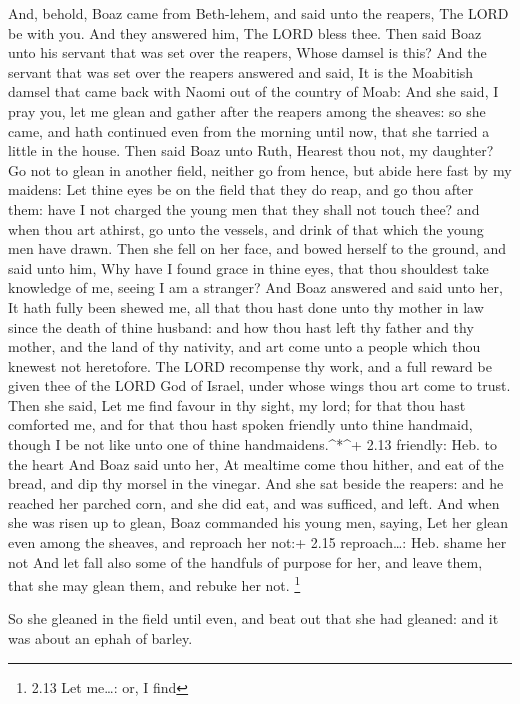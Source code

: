  And, behold, Boaz came from Beth-lehem, and said unto the
reapers, The LORD be with you. And they answered him, The LORD bless
thee.  Then said Boaz unto his servant that was set over the
reapers, Whose damsel is this?  And the servant that was set
over the reapers answered and said, It is the Moabitish damsel that came
back with Naomi out of the country of Moab:  And she said, I
pray you, let me glean and gather after the reapers among the sheaves:
so she came, and hath continued even from the morning until now, that
she tarried a little in the house.  Then said Boaz unto
Ruth, Hearest thou not, my daughter? Go not to glean in another field,
neither go from hence, but abide here fast by my maidens: 
Let thine eyes be on the field that they do reap, and go thou after
them: have I not charged the young men that they shall not touch thee?
and when thou art athirst, go unto the vessels, and drink of that which
the young men have drawn.  Then she fell on her face, and
bowed herself to the ground, and said unto him, Why have I found grace
in thine eyes, that thou shouldest take knowledge of me, seeing I am a
stranger?  And Boaz answered and said unto her, It hath
fully been shewed me, all that thou hast done unto thy mother in law
since the death of thine husband: and how thou hast left thy father and
thy mother, and the land of thy nativity, and art come unto a people
which thou knewest not heretofore.  The LORD recompense thy
work, and a full reward be given thee of the LORD God of Israel, under
whose wings thou art come to trust.  Then she said, Let me
find favour in thy sight, my lord; for that thou hast comforted me, and
for that thou hast spoken friendly unto thine handmaid, though I be not
like unto one of thine handmaidens.\^{}*\^{}+ 2.13 friendly: Heb. to the
heart  And Boaz said unto her, At mealtime come thou
hither, and eat of the bread, and dip thy morsel in the vinegar. And she
sat beside the reapers: and he reached her parched corn, and she did
eat, and was sufficed, and left.  And when she was risen up
to glean, Boaz commanded his young men, saying, Let her glean even among
the sheaves, and reproach her not:+ 2.15 reproach\ldots: Heb. shame her
not  And let fall also some of the handfuls of purpose for
her, and leave them, that she may glean them, and rebuke her not.
\footnote{2.13 Let me\ldots: or, I find}

 So she gleaned in the field until even, and beat out that
she had gleaned: and it was about an ephah of barley.

